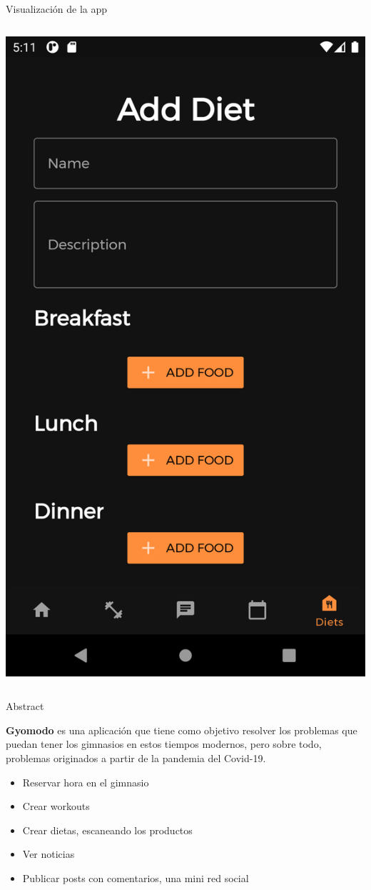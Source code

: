 \documentclass[12pt]{beamer}
\begin{document}
\begin{frame}{Visualización de la app}
\begin{columns}[t]
\includegraphics[width=\textwidth]{gymodo_add_diet}
\end{columns}

\end{frame}

\begin{frame}{Abstract}

\textbf{\color{gymodo_orange} Gyomodo} es una aplicación que tiene como objetivo resolver los problemas que puedan tener los gimnasios en estos tiempos modernos, pero sobre todo, problemas originados a partir de la pandemia del Covid-19.

\begin{itemize}
\item Reservar hora en el gimnasio
\item Crear workouts
\item Crear dietas, escaneando los productos
\item Ver noticias
\item Publicar posts con comentarios, una mini red social
\end{itemize}

\end{frame}
\end{document}
